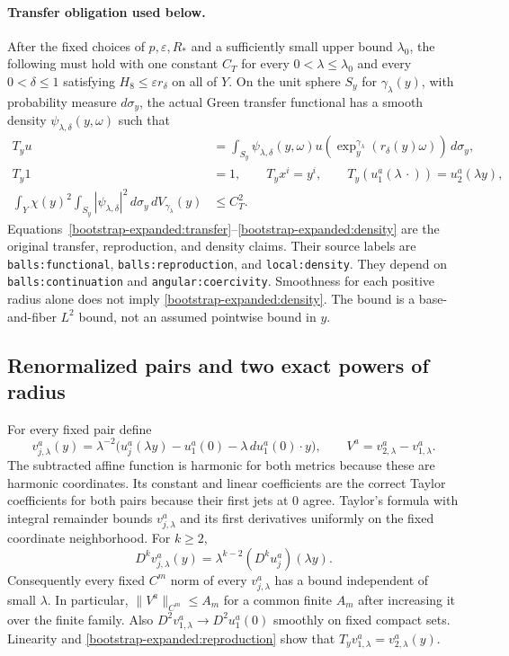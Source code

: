 \documentclass[11pt]{article}
\theoremstyle{definition}
\theoremstyle{remark}
\numberwithin{equation}{section}
\begin{document}
\paragraph{Transfer obligation used below.}
After the fixed choices of $p,\varepsilon,R_*$ and a sufficiently small
upper bound $\lambda_0$, the following must hold with one constant
$C_T$ for every $0<\lambda\leq\lambda_0$ and every $0<\delta\leq1$
satisfying $H_8\leq\varepsilon r_\delta$ on all of $Y$.
On the unit sphere $S_y$ for $\gamma_\lambda(y)$, with probability
measure $d\sigma_y$, the actual Green transfer functional has a smooth
density $\psi_{\lambda,\delta}(y,\omega)$ such that
\begin{align}
 T_yu&=\int_{S_y}\psi_{\lambda,\delta}(y,\omega)
       u(\exp_y^{\gamma_\lambda}(r_\delta(y)\omega))\,d\sigma_y,
       \label{bootstrap-expanded:transfer}\\
 T_y1&=1,\qquad T_yx^i=y^i,\qquad
 T_y(u_1^a(\lambda\,\cdot))=u_2^a(\lambda y),
       \label{bootstrap-expanded:reproduction}\\
 \int_Y\chi(y)^2\int_{S_y}|\psi_{\lambda,\delta}|^2\,d\sigma_y
                  \,dV_{\gamma_\lambda}(y)&\leq C_T^2.
       \label{bootstrap-expanded:density}
\end{align}
Equations~\eqref{bootstrap-expanded:transfer}--\eqref{bootstrap-expanded:density}
are the original transfer, reproduction, and density claims.  Their
source labels are \texttt{balls:\allowbreak{}functional},
\texttt{balls:\allowbreak{}reproduction}, and
\texttt{local:\allowbreak{}density}.  They depend on
\texttt{balls:\allowbreak{}continuation} and
\texttt{angular:\allowbreak{}coercivity}.
Smoothness for each positive radius alone
does not imply \eqref{bootstrap-expanded:density}.  The bound is a base-and-fiber
$L^2$ bound, not an assumed pointwise bound in $y$.

\subsection{Renormalized pairs and two exact powers of radius}
\label{bootstrap-expanded:moment}

For every fixed pair define
\[
 v_{j,\lambda}^a(y)=\lambda^{-2}
  \bigl(u_j^a(\lambda y)-u_1^a(0)
              -\lambda\,du_1^a(0)\cdot y\bigr),
 \qquad V^a=v_{2,\lambda}^a-v_{1,\lambda}^a.
\]
The subtracted affine function is harmonic for both metrics because
these are harmonic coordinates.  Its constant and linear coefficients
are the correct Taylor coefficients for both pairs because their
first jets at $0$ agree.  Taylor's formula with integral remainder
bounds $v_{j,\lambda}^a$ and its first derivatives uniformly on the
fixed coordinate neighborhood.  For $k\geq2$,
\[
 D^kv_{j,\lambda}^a(y)=\lambda^{k-2}(D^ku_j^a)(\lambda y).
\]
Consequently every fixed $C^m$ norm of every $v_{j,\lambda}^a$ has a
bound independent of small $\lambda$.  In particular,
$\|V^a\|_{C^m}\leq A_m$ for a common finite $A_m$ after increasing
it over the finite family.  Also
$D^2v_{1,\lambda}^a\to D^2u_1^a(0)$ smoothly on fixed compact sets.
Linearity and \eqref{bootstrap-expanded:reproduction} show that
$T_yv_{1,\lambda}^a=v_{2,\lambda}^a(y)$.
\end{document}
